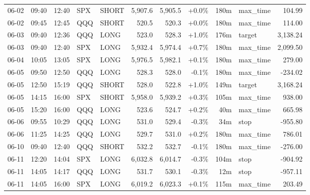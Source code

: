 \documentclass[11pt,a4paper,twoside]{article}
\begin{document}
\begin{center}
\begin{longtable}{>{\color{txtmain}}l l l l l r r r r >{\color{txtmain}}l r}
06-02 & 09:40 & 12:40 & SPX & SHORT & 5,907.6 & 5,905.5 & \textcolor{wingreen}{+0.0\%} & 180m & max\_time & \textcolor{wingreen}{104.99} \\
06-02 & 09:45 & 12:45 & QQQ & SHORT & 520.5 & 520.3 & \textcolor{wingreen}{+0.0\%} & 180m & max\_time & \textcolor{wingreen}{114.00} \\
06-03 & 09:40 & 12:36 & QQQ & LONG & 523.0 & 528.3 & \textcolor{wingreen}{+1.0\%} & 176m & target & \textcolor{wingreen}{3,138.24} \\
06-03 & 09:40 & 12:40 & SPX & LONG & 5,932.4 & 5,974.4 & \textcolor{wingreen}{+0.7\%} & 180m & max\_time & \textcolor{wingreen}{2,099.50} \\
06-04 & 10:05 & 13:05 & SPX & LONG & 5,976.5 & 5,982.1 & \textcolor{wingreen}{+0.1\%} & 180m & max\_time & \textcolor{wingreen}{279.00} \\
06-05 & 09:50 & 12:50 & QQQ & LONG & 528.3 & 528.0 & \textcolor{lossred}{-0.1\%} & 180m & max\_time & \textcolor{lossred}{-234.02} \\
06-05 & 12:50 & 15:19 & QQQ & SHORT & 528.0 & 522.8 & \textcolor{wingreen}{+1.0\%} & 149m & target & \textcolor{wingreen}{3,168.24} \\
06-05 & 14:15 & 16:00 & SPX & SHORT & 5,958.0 & 5,939.2 & \textcolor{wingreen}{+0.3\%} & 105m & max\_time & \textcolor{wingreen}{938.00} \\
06-05 & 15:20 & 16:00 & QQQ & LONG & 523.6 & 524.7 & \textcolor{wingreen}{+0.2\%} & 40m & max\_time & \textcolor{wingreen}{665.98} \\
06-06 & 09:55 & 10:29 & QQQ & LONG & 531.0 & 529.4 & \textcolor{lossred}{-0.3\%} & 34m & stop & \textcolor{lossred}{-955.80} \\
06-06 & 11:25 & 14:25 & QQQ & LONG & 529.7 & 531.0 & \textcolor{wingreen}{+0.2\%} & 180m & max\_time & \textcolor{wingreen}{786.01} \\
06-10 & 09:40 & 12:40 & QQQ & SHORT & 532.2 & 532.7 & \textcolor{lossred}{-0.1\%} & 180m & max\_time & \textcolor{lossred}{-276.00} \\
06-11 & 12:20 & 14:04 & SPX & LONG & 6,032.8 & 6,014.7 & \textcolor{lossred}{-0.3\%} & 104m & stop & \textcolor{lossred}{-904.92} \\
06-11 & 14:05 & 14:17 & QQQ & LONG & 531.7 & 530.1 & \textcolor{lossred}{-0.3\%} & 12m & stop & \textcolor{lossred}{-957.11} \\
06-11 & 14:05 & 16:00 & SPX & LONG & 6,019.2 & 6,023.3 & \textcolor{wingreen}{+0.1\%} & 115m & max\_time & \textcolor{wingreen}{203.49} \\

\end{longtable}
\end{center}
\end{document}
